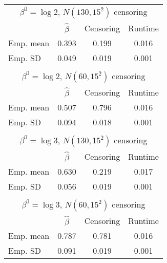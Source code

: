 \documentclass[english]{article}
\providecommand{\tabularnewline}{\\}
\begin{document}
\begin{table}[h]
{\protect\centering{}%
\begin{tabular}{l|c|c|c|}
\multicolumn{4}{c}{$\beta^{0}=\log2$, $N(130,15^{2})$ censoring}\tabularnewline
\cline{2-4} 
 & $\hat{\beta}$ & Censoring & Runtime\tabularnewline
\hline 
\multicolumn{1}{|l|}{Emp. mean} & 0.393 & 0.199 & 0.016\tabularnewline
\hline 
\multicolumn{1}{|l|}{Emp. SD} & 0.049 & 0.019 & 0.001\tabularnewline
\hline 
\multicolumn{1}{l}{} & \multicolumn{1}{c}{} & \multicolumn{1}{c}{} & \multicolumn{1}{c}{}\tabularnewline
\multicolumn{4}{c}{$\beta^{0}=\log2$, $N(60,15^{2})$ censoring}\tabularnewline
\cline{2-4} 
 & $\hat{\beta}$ & Censoring & Runtime\tabularnewline
\hline 
\multicolumn{1}{|l|}{Emp. mean} & 0.507 & 0.796 & 0.016\tabularnewline
\hline 
\multicolumn{1}{|l|}{Emp. SD} & 0.094 & 0.018 & 0.001\tabularnewline
\hline 
\multicolumn{1}{l}{} & \multicolumn{1}{c}{} & \multicolumn{1}{c}{} & \multicolumn{1}{c}{}\tabularnewline
\multicolumn{4}{c}{$\beta^{0}=\log3$, $N(130,15^{2})$ censoring}\tabularnewline
\cline{2-4} 
 & $\hat{\beta}$ & Censoring & Runtime\tabularnewline
\hline 
\multicolumn{1}{|l|}{Emp. mean} & 0.630 & 0.219 & 0.017\tabularnewline
\hline 
\multicolumn{1}{|l|}{Emp. SD} & 0.056 & 0.019 & 0.001\tabularnewline
\hline 
\multicolumn{1}{l}{} & \multicolumn{1}{c}{} & \multicolumn{1}{c}{} & \multicolumn{1}{c}{}\tabularnewline
\multicolumn{4}{c}{$\beta^{0}=\log3$, $N(60,15^{2})$ censoring}\tabularnewline
\cline{2-4} 
 & $\hat{\beta}$ & Censoring & Runtime\tabularnewline
\hline 
\multicolumn{1}{|l|}{Emp. mean} & 0.787 & 0.781 & 0.016\tabularnewline
\hline 
\multicolumn{1}{|l|}{Emp. SD} & 0.091 & 0.019 & 0.001\tabularnewline
\hline 
\end{tabular}\protect}\hfill{}
\end{table}
\end{document}
